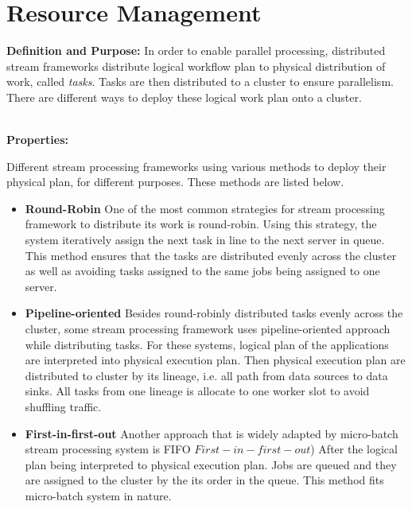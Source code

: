 \section{Resource Management}
\label{sec:resource}

\noindent\textbf{Definition and Purpose:} In order to enable parallel processing, distributed stream frameworks distribute logical workflow plan to physical distribution of work, called \textit{tasks}. Tasks are then distributed to a cluster to ensure parallelism. There are different ways to deploy these logical work plan onto a cluster. 



\noindent \textbf{\\Properties:}

Different stream processing frameworks using various methods to deploy their physical plan, for different purposes. These methods are listed below. 

\begin{itemize}
	
	
	\item \textbf{Round-Robin} One of the most common strategies for stream processing framework to distribute its work is round-robin. Using this strategy, the system iteratively assign the next task in line to the next server in queue. This method ensures that the tasks are distributed evenly across the cluster as well as avoiding tasks assigned to the same jobs being assigned to one server. 
	
	\item \textbf{Pipeline-oriented}
	Besides round-robinly distributed tasks evenly across the cluster, some stream processing framework uses pipeline-oriented approach while distributing tasks. For these systems, logical plan of the applications are interpreted into physical execution plan. Then physical execution plan are distributed to cluster by its lineage, i.e. all path from data sources to data sinks. All tasks from one lineage is allocate to one worker slot to avoid shuffling traffic.  
	
	\item \textbf{First-in-first-out}
	Another approach that is widely adapted by micro-batch stream processing system is FIFO \(First-in-first-out\)) After the logical plan being interpreted to physical execution plan. Jobs are queued and they are assigned to the cluster by the its order in the queue. This method fits micro-batch system in nature.
	

\end{itemize}

